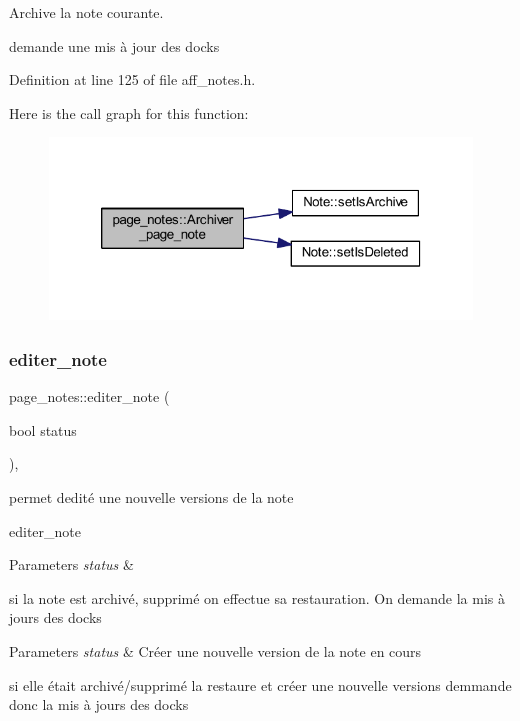 Archive la note courante. 

demande une mis à jour des docks 

Definition at line 125 of file aff\+\_\+notes.\+h.

Here is the call graph for this function\+:\nopagebreak
\begin{figure}[H]
\begin{center}
\leavevmode
\includegraphics[width=320pt]{classpage__notes_a8d23f8f379d4aa402193f589ac3e4afa_cgraph}
\end{center}
\end{figure}
\mbox{\label{classpage__notes_a9fd367fb577c6048353f18ad56792c1f}} 
\subsubsection{\texorpdfstring{editer\+\_\+note}{editer\_note}}
{\footnotesize\ttfamily page\+\_\+notes\+::editer\+\_\+note (\begin{DoxyParamCaption}\item[{bool}]{status }\end{DoxyParamCaption})\hspace{0.3cm}{\ttfamily [inline]}, {\ttfamily [slot]}}



permet d\textquotesingle{}edité une nouvelle versions de la note 

editer\+\_\+note 
\begin{DoxyParams}{Parameters}
{\em status} & \\
\hline
\end{DoxyParams}
si la note est archivé, supprimé on effectue sa restauration. On demande la mis à jours des docks


\begin{DoxyParams}{Parameters}
{\em status} & Créer une nouvelle version de la note en cours\\
\hline
\end{DoxyParams}
si elle était archivé/supprimé la restaure et créer une nouvelle versions demmande donc la mis à jours des docks 


